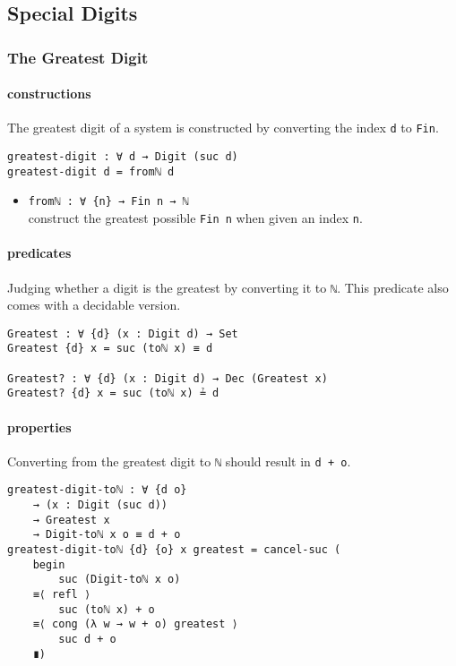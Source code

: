 \documentclass[../thesis.tex]{subfiles}
\begin{document}
\subsection{Special Digits}

\subsubsection{The Greatest Digit}

\paragraph{constructions}

The greatest digit of a system is constructed by converting the index {\lstinline|d|}
to {\lstinline|Fin|}.

\begin{lstlisting}
greatest-digit : ∀ d → Digit (suc d)
greatest-digit d = fromℕ d
\end{lstlisting}

\begin{itemize}
    \item {\lstinline|fromℕ : ∀ {n} → Fin n → ℕ|}
        \\ construct the greatest possible {\lstinline|Fin n|} when given an index {\lstinline|n|}.
\end{itemize}

\paragraph{predicates}

Judging whether a digit is the greatest by converting it to {\lstinline|ℕ|}.
This predicate also comes with a decidable version.

\begin{lstlisting}
Greatest : ∀ {d} (x : Digit d) → Set
Greatest {d} x = suc (toℕ x) ≡ d

Greatest? : ∀ {d} (x : Digit d) → Dec (Greatest x)
Greatest? {d} x = suc (toℕ x) ≟ d
\end{lstlisting}

\paragraph{properties}

Converting from the greatest digit to {\lstinline|ℕ|} should result in {\lstinline|d + o|}.

\begin{lstlisting}
greatest-digit-toℕ : ∀ {d o}
    → (x : Digit (suc d))
    → Greatest x
    → Digit-toℕ x o ≡ d + o
greatest-digit-toℕ {d} {o} x greatest = cancel-suc (
    begin
        suc (Digit-toℕ x o)
    ≡⟨ refl ⟩
        suc (toℕ x) + o
    ≡⟨ cong (λ w → w + o) greatest ⟩
        suc d + o
    ∎)
\end{lstlisting}
\end{document}
